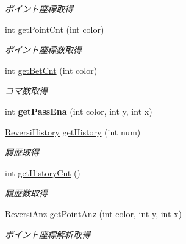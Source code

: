 \begin{DoxyCompactItemize}
\begin{DoxyCompactList}\small\item\em ポイント座標取得 \end{DoxyCompactList}\item 
int \hyperlink{classjp_1_1gr_1_1java__conf_1_1yuta__yoshinaga_1_1reversi_1_1model_1_1_reversi_a8ab289d67a725a30e92411c90b755bd8}{get\+Point\+Cnt} (int color)
\begin{DoxyCompactList}\small\item\em ポイント座標数取得 \end{DoxyCompactList}\item 
int \hyperlink{classjp_1_1gr_1_1java__conf_1_1yuta__yoshinaga_1_1reversi_1_1model_1_1_reversi_a9f826e110ec3298a6bc5d6987a94519c}{get\+Bet\+Cnt} (int color)
\begin{DoxyCompactList}\small\item\em コマ数取得 \end{DoxyCompactList}\item 
\mbox{\label{classjp_1_1gr_1_1java__conf_1_1yuta__yoshinaga_1_1reversi_1_1model_1_1_reversi_a418bc05a3aaa3252455e75d10e1d1441}} 
int {\bfseries get\+Pass\+Ena} (int color, int y, int x)
\item 
\hyperlink{classjp_1_1gr_1_1java__conf_1_1yuta__yoshinaga_1_1reversi_1_1model_1_1_reversi_history}{Reversi\+History} \hyperlink{classjp_1_1gr_1_1java__conf_1_1yuta__yoshinaga_1_1reversi_1_1model_1_1_reversi_af781f5ebb4fb33b574ec58acfb45a796}{get\+History} (int num)
\begin{DoxyCompactList}\small\item\em 履歴取得 \end{DoxyCompactList}\item 
int \hyperlink{classjp_1_1gr_1_1java__conf_1_1yuta__yoshinaga_1_1reversi_1_1model_1_1_reversi_a286949e070d0cfc8a1d9562a298b7b98}{get\+History\+Cnt} ()
\begin{DoxyCompactList}\small\item\em 履歴数取得 \end{DoxyCompactList}\item 
\hyperlink{classjp_1_1gr_1_1java__conf_1_1yuta__yoshinaga_1_1reversi_1_1model_1_1_reversi_anz}{Reversi\+Anz} \hyperlink{classjp_1_1gr_1_1java__conf_1_1yuta__yoshinaga_1_1reversi_1_1model_1_1_reversi_a6da3f67c0468cf59ba6ceb796133c921}{get\+Point\+Anz} (int color, int y, int x)
\begin{DoxyCompactList}\small\item\em ポイント座標解析取得 \end{DoxyCompactList}\item 

\end{DoxyCompactItemize}
